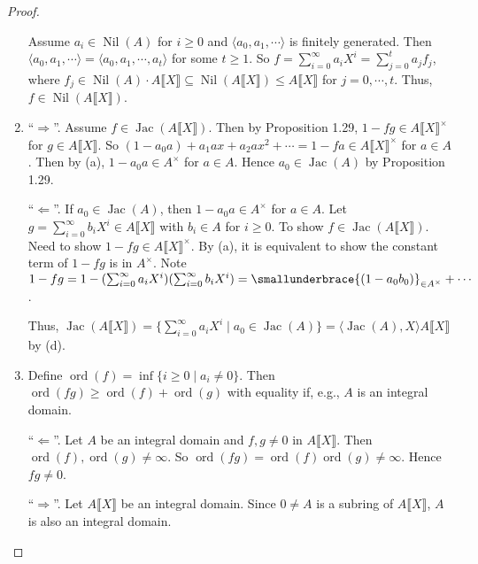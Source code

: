 \begin{proof}
\begin{enumerate}
            Assume $a_i \in \operatorname{Nil}(A)$ for $i \geq 0$ and $\langle a_0,a_1,\cdots \rangle$ is finitely generated. Then $\langle a_0,a_1,\cdots \rangle = \langle a_0,a_1,\cdots,a_t \rangle$ for some $t \geq 1$. So $f = \sum_{i=0}^\infty a_iX^i = \sum_{j=0}^t a_jf_j$, where $f_j \in \operatorname{Nil}(A) \cdot A \llbracket X \rrbracket \subseteq \operatorname{Nil}(A\llbracket X \rrbracket) \leq A\llbracket X \rrbracket$ for $j = 0,\cdots,t$. Thus, $f \in \operatorname{Nil}(A\llbracket X \rrbracket)$. 
        \item  ``$\Rightarrow$''. Assume $f \in \operatorname{Jac}(A\llbracket X \rrbracket)$. Then by Proposition 1.29, $1-fg \in A\llbracket X \rrbracket^\times$ for $g \in A\llbracket X \rrbracket$. So $(1-a_0a) + a_1ax + a_2ax^2 + \cdots = 1-fa \in A\llbracket X \rrbracket^\times$ for $a \in A$. Then by (a), $1-a_0a \in A^\times$ for $a \in A$. Hence $a_0 \in \operatorname{Jac}(A)$ by Proposition 1.29. \par 
            ``$\Leftarrow$''. If $a_0 \in \operatorname{Jac}(A)$, then $1-a_0a \in A^\times$ for $a \in A$. Let $g = \sum_{i=0}^\infty b_iX^i \in A\llbracket X \rrbracket$ with $b_i \in A$ for $i \geq 0$. To show $f \in \operatorname{Jac}(A\llbracket X \rrbracket)$. Need to show $1-fg \in A\llbracket X \rrbracket^\times$. By (a), it is equivalent to show the constant term of $1-fg$ is in $A^\times$. Note $1-fg = 1-(\sum_{i=0}^\infty a_iX^i)(\sum_{i=0}^\infty b_iX^i) = \smallunderbrace{(1-a_0b_0)}_{\in A^\times} + \cdots$. \par 
            Thus, $\operatorname{Jac}(A\llbracket X \rrbracket) = \{\sum_{i=0}^\infty a_iX^i \mid a_0 \in \operatorname{Jac}(A)\} = \langle \operatorname{Jac}(A),X \rangle A \llbracket X \rrbracket$ by (d). 
        \item 
            Define $\operatorname{ord}(f) = \inf\{i \geq 0 \mid a_i \neq 0\}$. Then $\operatorname{ord}(fg) \geq \operatorname{ord}(f) + \operatorname{ord}(g)$ with equality if, e.g., $A$ is an integral domain. \par 
            ``$\Leftarrow$''. Let $A$ be an integral domain and $f,g \neq 0$ in $A\llbracket X \rrbracket$. Then $\operatorname{ord}(f),\operatorname{ord}(g) \neq \infty$. So $\operatorname{ord}(fg) = \operatorname{ord}(f)\operatorname{ord}(g) \neq \infty$. Hence $fg \neq 0$. \par
            ``$\Rightarrow$''. Let $A\llbracket X \rrbracket$ be an integral domain. Since $0 \neq A$ is a subring of $A\llbracket X \rrbracket$, $A$ is also an integral domain. \par

\end{enumerate}
\end{proof}
